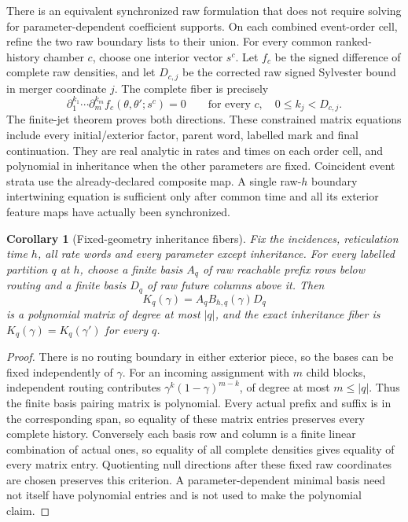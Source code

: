 \documentclass[11pt]{article}
\newtheorem{corollary}[theorem]{Corollary}
\begin{document}
There is an equivalent synchronized raw formulation that does not require solving for parameter-dependent coefficient supports.  On each combined event-order cell, refine the two raw boundary lists to their union.  For every common ranked-history chamber $c$, choose one interior vector $s^c$.  Let $f_c$ be the signed difference of complete raw densities, and let $D_{c,j}$ be the corrected raw signed Sylvester bound in merger coordinate $j$.  The complete fiber is precisely
\[
\partial_1^{k_1}\cdots\partial_m^{k_m}
 f_c(\theta,\theta';s^c)=0
 \qquad\text{for every }c,\quad 0\le k_j<D_{c,j}.
\]
The finite-jet theorem proves both directions.  These constrained matrix equations include every initial/exterior factor, parent word, labelled mark and final continuation.  They are real analytic in rates and times on each order cell, and polynomial in inheritance when the other parameters are fixed.  Coincident event strata use the already-declared composite map.  A single raw-$h$ boundary intertwining equation is sufficient only after common time and all its exterior feature maps have actually been synchronized.

\begin{corollary}[Fixed-geometry inheritance fibers]
Fix the incidences, reticulation time $h$, all rate words and every parameter except inheritance.  For every labelled partition $q$ at $h$, choose a finite basis $A_q$ of raw reachable prefix rows below routing and a finite basis $D_q$ of raw future columns above it.  Then
\[
K_q(\gamma)=A_qB_{h,q}(\gamma)D_q
\]
is a polynomial matrix of degree at most $|q|$, and the exact inheritance fiber is $K_q(\gamma)=K_q(\gamma')$ for every $q$.
\end{corollary}

\begin{proof}
There is no routing boundary in either exterior piece, so the bases can be fixed independently of $\gamma$.  For an incoming assignment with $m$ child blocks, independent routing contributes $\gamma^k(1-\gamma)^{m-k}$, of degree at most $m\le|q|$.  Thus the finite basis pairing matrix is polynomial.  Every actual prefix and suffix is in the corresponding span, so equality of these matrix entries preserves every complete history.  Conversely each basis row and column is a finite linear combination of actual ones, so equality of all complete densities gives equality of every matrix entry.  Quotienting null directions after these fixed raw coordinates are chosen preserves this criterion.  A parameter-dependent minimal basis need not itself have polynomial entries and is not used to make the polynomial claim.
\end{proof}
\end{document}
